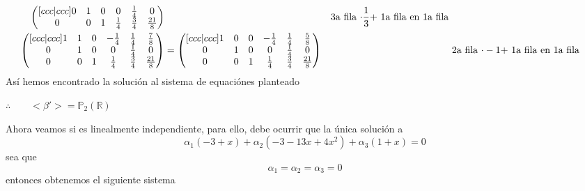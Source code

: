 \documentclass[letterpaper]{article}
\newcommand{\Po}{\mathds{P}_2(\mathds{R})}
\renewcommand{\*}{\cdot}
\theoremstyle{definition}
\begin{document}
\begin{align*}
\begin{pmatrix}[ccc|ccc]
	0 & 1 & 0 & 0 & \frac{1}{4} & 0\\
	0 & 0 & 1 & \frac{1}{4} & \frac{3}{4} & \frac{21}{8}
	\end{pmatrix}  && \text{3a fila $ \* \frac{1}{3} + $ 1a fila en 1a fila } \\
	\begin{pmatrix}[ccc|ccc]
	1 & 1 & 0 & -\frac{1}{4} & \frac{1}{4} & \frac{7}{8} \\
	0 & 1 & 0 & 0 & \frac{1}{4} & 0\\
	0 & 0 & 1 & \frac{1}{4} & \frac{3}{4} & \frac{21}{8}
	\end{pmatrix} &= \begin{pmatrix}[ccc|ccc]
	1 & 0 & 0 & -\frac{1}{4} & \frac{1}{4} & \frac{5}{8} \\
	0 & 1 & 0 & 0 & \frac{1}{4} & 0\\
	0 & 0 & 1 & \frac{1}{4} & \frac{3}{4} & \frac{21}{8}
	\end{pmatrix} && \text{2a fila $ \* -1 + $ 1a fila en 1a fila}
\end{align*}
Así hemos encontrado la solución al sistema de equaciónes planteado
\begin{center}
	$ \therefore \qquad <\beta'> = \Po$
\end{center}
Ahora veamos si es linealmente independiente, para ello, debe ocurrir que la única solución a \[ \alpha_1(-3 + x) + \alpha_2(-3 -13x + 4x^2) + \alpha_3(1 + x) = 0 \]
sea que $$ \alpha_1 = \alpha_2 =  \alpha_3 = 0 $$
entonces obtenemos el siguiente sistema
\end{document}
